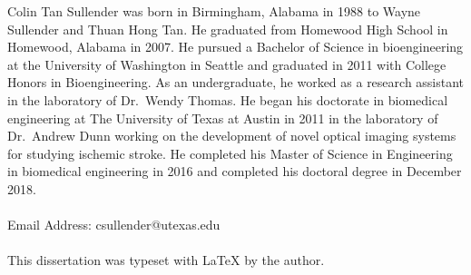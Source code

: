 \documentclass[12pt]{report}
\begin{document}
\begin{vita}
\noindent Colin Tan Sullender was born in Birmingham, Alabama in 1988 to Wayne Sullender and Thuan Hong Tan. He graduated from Homewood High School in Homewood, Alabama in 2007. He pursued a Bachelor of Science in bioengineering at the University of Washington in Seattle and graduated in 2011 with College Honors in Bioengineering. As an undergraduate, he worked as a research assistant in the laboratory of Dr.\ Wendy Thomas. He began his doctorate in biomedical engineering at The University of Texas at Austin in 2011 in the laboratory of Dr.\ Andrew Dunn working on the development of novel optical imaging systems for studying ischemic stroke. He completed his Master of Science in Engineering in biomedical engineering in 2016 and completed his doctoral degree in December 2018.
\\
\\
Email Address: csullender@utexas.edu
\\
\\
This dissertation was typeset with \LaTeX{} by the author.
\end{vita}


\end{document}
